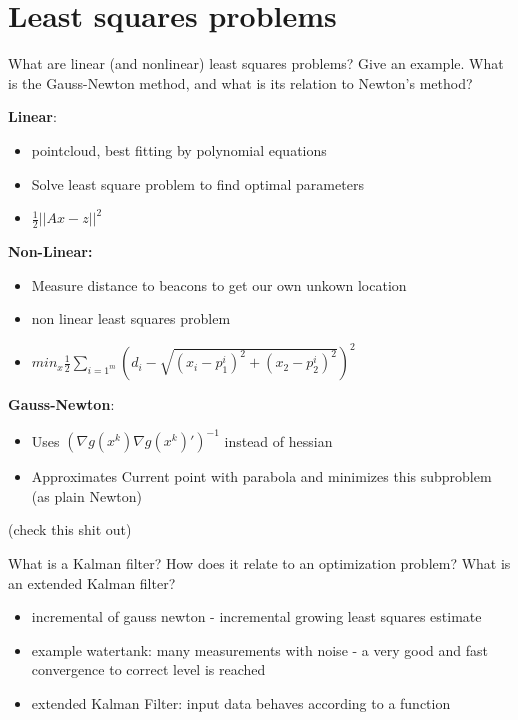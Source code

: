 \documentclass{article}
\begin{document}
\section{Least squares problems}

\begin{question}
  What are linear (and nonlinear) least squares problems? Give an example.  What is the Gauss-Newton
  method, and what is its relation to Newton’s method?
\end{question}
\textbf{Linear}:
\begin{itemize}
\item pointcloud, best fitting by polynomial equations
\item Solve least square problem to find optimal parameters
\item $\frac{1}{2}|| Ax - z ||^2$
\end{itemize} 
\textbf{Non-Linear:}
\begin{itemize}
\item Measure distance to beacons to get our own unkown location
\item non linear least squares problem
\item $min_x \frac{1}{2} \sum_{i = 1^m} (d_i - \sqrt{(x_i - p_1^i)^2 + (x_2 - p_2^i)^2})^2$
\end{itemize} 
\textbf{Gauss-Newton}:
\begin{itemize}
\item Uses $(\nabla g(x^k)\nabla g(x^k)')^{-1}$ instead of hessian
\item Approximates Current point with parabola and minimizes this subproblem (as plain Newton)
\end{itemize}
(check this shit out)

\begin{question}
  What is a Kalman filter? How does it relate to an optimization problem?  What is an extended
  Kalman filter?
\end{question}
\begin{itemize}
\item incremental of gauss newton - incremental growing least squares estimate
\item example watertank: many measurements with noise - a very good and fast convergence to correct
  level is reached
\item extended Kalman Filter: input data behaves according to a function
\end{itemize}
\end{document}
